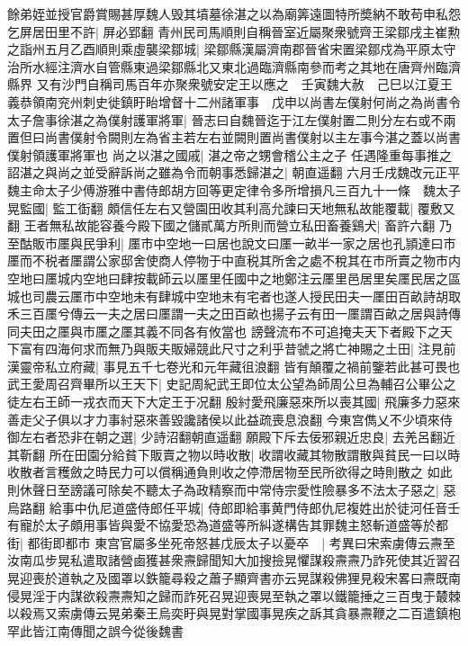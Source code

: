 餘弟姪並授官爵賞賜甚厚魏人毁其墳墓徐湛之以為廟筭遠圖特所奬納不敢苟申私怨乞屏居田里不許|{
	屏必郢翻}
青州民司馬順則自稱晉室近屬聚衆號齊王梁鄒戌主崔勲之詣州五月乙酉順則乘虛襲梁鄒城|{
	梁鄒縣漢屬濟南郡晉省宋置梁鄒戍為平原太守治所水經注濟水自管縣東過梁鄒縣北又東北過臨濟縣南參而考之其地在唐齊州臨濟縣界}
又有沙門自稱司馬百年亦聚衆號安定王以應之　壬寅魏大赦　己巳以江夏王義恭領南兖州刺史徙鎮盱眙增督十二州諸軍事　戊申以尚書左僕射何尚之為尚書令太子詹事徐湛之為僕射護軍將軍|{
	晉志曰自魏晉迄于江左僕射置二則分左右或不兩置但曰尚書僕射令闕則左為省主若左右並闕則置尚書僕射以主左事今湛之蓋以尚書僕射領護軍將軍也}
尚之以湛之國戚|{
	湛之帝之甥會稽公主之子}
任遇隆重每事推之詔湛之與尚之並受辭訴尚之雖為令而朝事悉歸湛之|{
	朝直遥翻}
六月壬戌魏改元正平　魏主命太子少傅游雅中書侍郎胡方回等更定律令多所增損凡三百九十一條　魏太子晃監國|{
	監工衘翻}
頗信任左右又營園田收其利高允諫曰天地無私故能覆載|{
	覆敷又翻}
王者無私故能容養今殿下國之儲貳萬方所則而營立私田畜養鷄犬|{
	畜許六翻}
乃至酤販市㕓與民爭利|{
	㕓市中空地一曰居也說文曰㕓一畝半一家之居也孔頴達曰市㕓而不税者㕓謂公家邸舍使商人停物于中直税其所舍之處不稅其在市所賣之物市内空地曰㕓城内空地曰肆按載師云以㕓里任國中之地鄭注云㕓里邑居里矣㕓民居之區城也司農云㕓市中空地未有肆城中空地未有宅者也遂人授民田夫一㕓田百畝詩胡取禾三百㕓兮傳云一夫之居曰㕓謂一夫之田百畝也揚子云有田一㕓謂百畝之居與詩傳同夫田之㕓與市㕓之㕓其義不同各有攸當也}
謗聲流布不可追掩夫天下者殿下之天下富有四海何求而無乃與販夫販婦競此尺寸之利乎昔虢之將亡神賜之土田|{
	注見前}
漢靈帝私立府藏|{
	事見五千七卷光和元年藏徂浪翻}
皆有顛覆之禍前鑒若此甚可畏也武王愛周召齊畢所以王天下|{
	史記周紀武王即位太公望為師周公旦為輔召公畢公之徒左右王師一戎衣而天下大定王于况翻}
殷紂愛飛廉惡來所以喪其國|{
	飛廉多力惡來善走父子俱以才力事紂惡來善毀讒諸侯以此益疏喪息浪翻}
今東宫儁乂不少頃來侍御左右者恐非在朝之選|{
	少詩沼翻朝直遥翻}
願殿下斥去佞邪親近忠良|{
	去羌呂翻近其靳翻}
所在田園分給貧下販賣之物以時收散|{
	收謂收藏其物散謂散與貧民一曰以時收散者言穫斂之時民力可以償稱通負則收之停滯居物至民所欲得之時則散之}
如此則休聲日至謗議可除矣不聽太子為政精察而中常侍宗愛性險暴多不法太子惡之|{
	惡烏路翻}
給事中仇尼道盛侍郎任平城|{
	侍郎即給事黄門侍郎仇尼複姓出於徒河任音壬}
有寵於太子頗用事皆與愛不協愛恐為道盛等所糾遂構告其罪魏主怒斬道盛等於都街|{
	都街即都市}
東宫官屬多坐死帝怒甚戊辰太子以憂卒　|{
	考異曰宋索虜傳云燾至汝南瓜步晃私遣取諸營鹵獲甚衆燾歸聞知大加搜撿晃懼謀殺燾燾乃詐死使其近習召晃迎喪於道執之及國罩以鉄籠尋殺之蕭子顯齊書亦云晃謀殺佛狸見殺宋畧曰燾既南侵晃淫于内謀欲殺燾燾知之歸而詐死召晃迎喪晃至執之罩以鐵籠捶之三百曳于樷棘以殺焉又索虜傳云晃弟秦王烏奕盱與晃對掌國事晃疾之訴其貪暴燾鞭之二百遣鎮枹罕此皆江南傳聞之誤今從後魏書}
